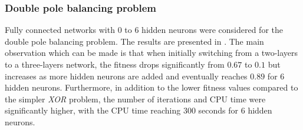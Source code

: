 \subsubsection{Double pole balancing problem}

Fully connected networks with $0$ to $6$ hidden neurons were considered for the double pole balancing problem. The results are presented in .
The main observation which can be made is that when initially switching from a two-layers to a three-layers network, the fitness drops significantly from $0.67$ to $0.1$ but
increases as more hidden neurons are added and eventually reaches $0.89$ for $6$ hidden neurons. Furthermore, in addition to the lower fitness values compared to the simpler \textit{XOR} problem,
the number of iterations and CPU time were significantly higher, with the CPU time reaching $300$ seconds for $6$ hidden neurons.

